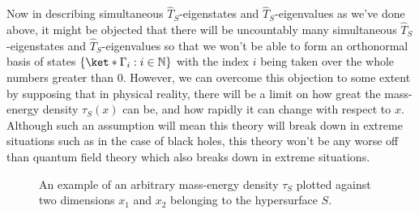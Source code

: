 \documentclass[12pt]{report}
\begin{document}
Now in describing simultaneous $\hat{T}_S$-eigenstates and  $\hat{T}_S$-eigenvalues as we've done above, it might be objected that there will be uncountably many simultaneous $\hat{T}_S$-eigenstates and  $\hat{T}_S$-eigenvalues so that we won't be able to form an orthonormal basis of states $\{\ket*{\Gamma_{i}}:i\in\mathbb{N}\}$ with the index $i$ being taken over the whole numbers greater than $0$. However, we can overcome this objection to some extent by supposing that in physical reality, there will be a limit on how great the mass-energy density $\tau_S(x)$ can be, and how rapidly it can change with respect to $x$. Although such an assumption will mean this theory will break down in extreme situations such as in the case of black holes, this theory won't be any worse off than quantum field theory which also breaks down in extreme situations.
\begin{figure}[ht!]
  \captionsetup{justification=justified}
  \centering
  
  \vspace*{2px}
  \caption[Example of an arbitrary mass-energy density]{An example of an arbitrary mass-energy density $\tau_S$ plotted against two dimensions $x_1$ and $x_2$ belonging to the hypersurface $S$. }\label{tauSexample}
  \end{figure}
\end{document}
